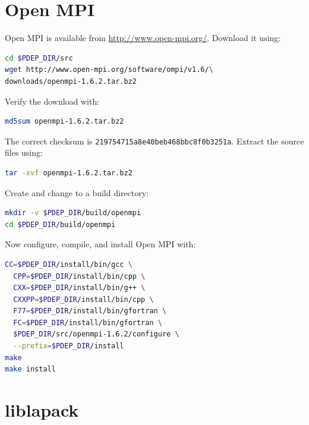 \documentclass[a4paper]{article}
\begin{document}
\section{Open MPI}

Open MPI is available from \url{http://www.open-mpi.org/}. Download it using:
\begin{lstlisting}[language = bash, frame = single]
cd $PDEP_DIR/src
wget http://www.open-mpi.org/software/ompi/v1.6/\
downloads/openmpi-1.6.2.tar.bz2
\end{lstlisting}
Verify the download with:
\begin{lstlisting}[language = bash, frame = single]
md5sum openmpi-1.6.2.tar.bz2
\end{lstlisting}
The correct checksum is \verb+219754715a8e40beb468bbc8f0b3251a+. Extract the
source files using:
\begin{lstlisting}[language = bash, frame = single]
tar -xvf openmpi-1.6.2.tar.bz2
\end{lstlisting}
Create and change to a build directory:
\begin{lstlisting}[language = bash, frame = single]
mkdir -v $PDEP_DIR/build/openmpi
cd $PDEP_DIR/build/openmpi
\end{lstlisting}
Now configure, compile, and install Open MPI with:
\begin{lstlisting}[language = bash, frame = single]
CC=$PDEP_DIR/install/bin/gcc \
  CPP=$PDEP_DIR/install/bin/cpp \
  CXX=$PDEP_DIR/install/bin/g++ \
  CXXPP=$PDEP_DIR/install/bin/cpp \
  F77=$PDEP_DIR/install/bin/gfortran \
  FC=$PDEP_DIR/install/bin/gfortran \
  $PDEP_DIR/src/openmpi-1.6.2/configure \
  --prefix=$PDEP_DIR/install
make
make install
\end{lstlisting}

\section{liblapack}
\end{document}
